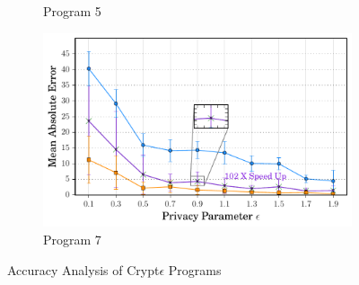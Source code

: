 \begin{figure}[ht]
\begin{subfigure}[b]{0.25\linewidth}
        \caption{Program 5}
        \label{fig:P5}\end{subfigure}%
      \begin{subfigure}[b]{0.25\linewidth}
    \centering    \includegraphics[width=1\linewidth]{7_final.pdf}
        \caption{Program 7}
        \label{fig:P7}
    \end{subfigure}
   \caption{Accuracy Analysis of Crypt$\epsilon$ Programs}
   \label{accuracy}
\end{figure}